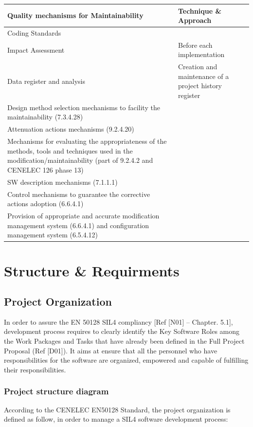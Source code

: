 \documentclass{template/openetcs_article}
\begin{document}
\begin{flushleft}
\tablefirsthead{}
\tablehead{}
\tabletail{}
\tablelasttail{}
\begin{supertabular}{|m{7cm}|m{7cm}|}
\hline
Quality mechanisms for Maintainability &
Technique \& Approach\\\hline
Coding Standards &
~
\\\hline
Impact Assessment &
Before each implementation\\\hline
Data register and analysis &
Creation and maintenance of a project history register\\\hline
Design method selection mechanisms to facility the maintainability (7.3.4.28) &
~
\\\hline
Attenuation actions mechanisms (9.2.4.20) &
~
\\\hline
Mechanisms for evaluating the appropriateness of the methods, tools and techniques used in the modification/maintainability (part of 9.2.4.2 and CENELEC 126 phase 13) &
~
\\\hline
SW description mechanisms (7.1.1.1) &
~
\\\hline
Control mechanisms to guarantee the corrective actions adoption (6.6.4.1) &
~
\\\hline
Provision of appropriate and accurate modification management system (6.6.4.1) and configuration management system (6.5.4.12) &
~
\\\hline
\end{supertabular}
\end{flushleft}


\section{Structure \& Requirments}

\subsection{Project Organization}
In order to assure the EN 50128 SIL4 compliancy [Ref [N01] -- Chapter. 5.1], development process requires to clearly identify the Key Software Roles among the Work Packages and Tasks that have already been defined in the Full Project Proposal (Ref [D01]). It aims at ensure that all the personnel who have responsibilities for the software are organized, empowered and capable of fulfilling their responsibilities.



\subsubsection{Project structure diagram}
According to the CENELEC EN50128 Standard, the project organization is defined as follow, in order to manage a SIL4 software development process:
\end{document}
